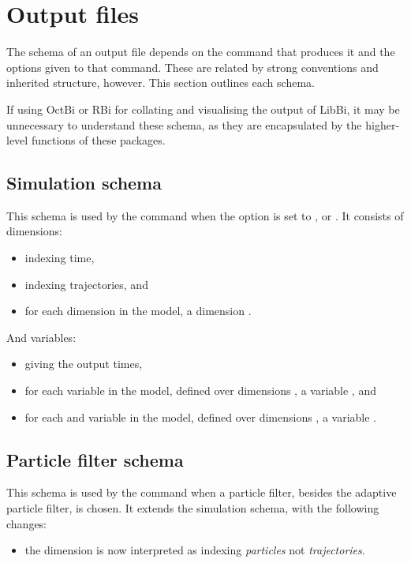 \section{Output files}

The schema of an output file depends on the command that produces it and the
options given to that command. These are related by strong conventions and
inherited structure, however. This section outlines each schema.

\begin{tip}
If using OctBi or RBi for collating and visualising the output of LibBi, it
may be unnecessary to understand these schema, as they are encapsulated by
the higher-level functions of these packages.
\end{tip}

\subsection{Simulation schema}

This schema is used by the  command when the 
option is set to ,  or . It consists
of dimensions:
\begin{itemize}
\item {} indexing time,
\item {} indexing trajectories, and
\item for each dimension  in the model, a dimension
  .
\end{itemize}
And variables:
\begin{itemize}
\item {} giving the output times,
\item for each  variable  in the model,
  defined over dimensions , a variable
  , and
\item for each  and  variable  in the
  model, defined over dimensions , a variable
  .
\end{itemize}

\subsection{Particle filter schema}

This schema is used by the  command when a particle filter,
besides the adaptive particle filter, is chosen. It extends the simulation
schema, with the following changes:
\begin{itemize}
\item the  dimension is now interpreted as indexing \emph{particles}
  not \emph{trajectories}.
\end{itemize}

